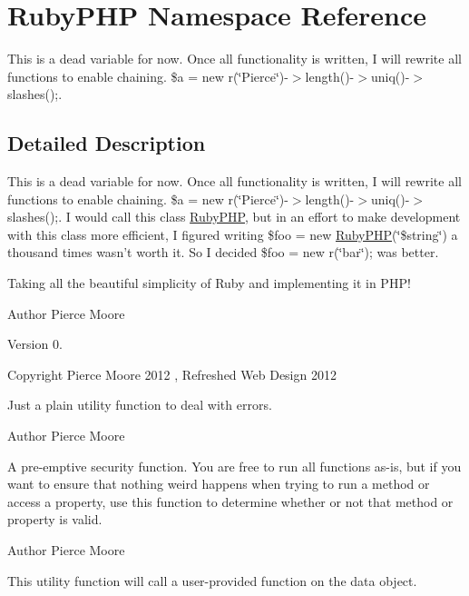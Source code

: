 \hypertarget{namespace_ruby_p_h_p}{\section{Ruby\-P\-H\-P Namespace Reference}
\label{namespace_ruby_p_h_p}
}


This is a dead variable for now. Once all functionality is written, I will rewrite all functions to enable chaining. \$a = new r(\char`\"{}\-Pierce\char`\"{})-\/$>$length()-\/$>$uniq()-\/$>$slashes();.  




\subsection{Detailed Description}
This is a dead variable for now. Once all functionality is written, I will rewrite all functions to enable chaining. \$a = new r(\char`\"{}\-Pierce\char`\"{})-\/$>$length()-\/$>$uniq()-\/$>$slashes();. I would call this class \hyperlink{namespace_ruby_p_h_p}{Ruby\-P\-H\-P}, but in an effort to make development with this class more efficient, I figured writing \$foo = new \hyperlink{namespace_ruby_p_h_p}{Ruby\-P\-H\-P}(\char`\"{}\$string\char`\"{}) a thousand times wasn't worth it. So I decided \$foo = new r(\char`\"{}bar\char`\"{}); was better.

Taking all the beautiful simplicity of Ruby and implementing it in P\-H\-P! \begin{DoxyAuthor}{Author}
Pierce Moore 
\end{DoxyAuthor}
\begin{DoxyVersion}{Version}
0. 
\end{DoxyVersion}
\begin{DoxyCopyright}{Copyright}
Pierce Moore 2012 , Refreshed Web Design 2012
\end{DoxyCopyright}
Just a plain utility function to deal with errors.

\begin{DoxyAuthor}{Author}
Pierce Moore
\end{DoxyAuthor}
A pre-\/emptive security function. You are free to run all functions as-\/is, but if you want to ensure that nothing weird happens when trying to run a method or access a property, use this function to determine whether or not that method or property is valid.

\begin{DoxyAuthor}{Author}
Pierce Moore
\end{DoxyAuthor}
This utility function will call a user-\/provided function on the data object.

